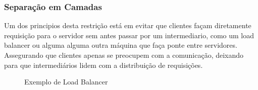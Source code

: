 \subsubsection[Separação em Camadas]{Separação em Camadas}

Um dos principios desta restrição está em evitar que clientes façam diretamente requisição para o servidor sem antes passar por um intermediario, como um load balancer ou alguma alguma outra máquina que faça ponte entre servidores. Assegurando que clientes apenas se preocupem com a comunicação, deixando para que intermediários lidem com a distribuição de requisições. \cite{Fielding2000}

\begin{figure}[H]
  \centering
  \caption{Exemplo de Load Balancer}
\end{figure}
